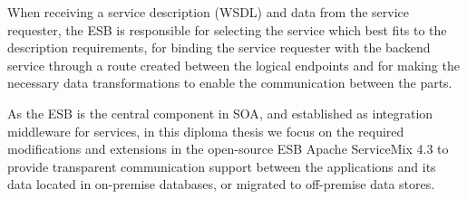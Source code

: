 

When receiving a service description (\ac{WSDL}) and data from the service requester, the \ac{ESB} is responsible for selecting the service which best fits to the description requirements, for binding the service requester with the backend service through a route created between the logical endpoints and for making the necessary data transformations to enable the communication between the parts.

As the \ac{ESB} is the central component in \ac{SOA}, and established as integration middleware for services, in this diploma thesis we focus on the required modifications and extensions in the open-source \ac{ESB} Apache ServiceMix 4.3 to provide transparent communication support between the applications and its data located in on-premise databases, or migrated to off-premise data stores. 

\FloatBarrier